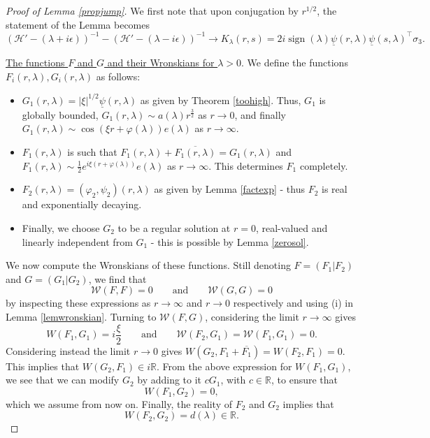 \documentclass[11 pt]{amsart}
\theoremstyle{definition}
\theoremstyle{remark}
\numberwithin{equation}{section}
\begin{document}
\begin{proof}[Proof of Lemma \ref{propjump}] We first note that upon conjugation by $r^{1/2}$, the statement of the Lemma becomes
$$
(\mathcal{H}'- (\lambda + i\epsilon))^{-1} - (\mathcal{H}'- (\lambda - i\epsilon))^{-1}
\longrightarrow K_\lambda(r,s) = 2 i \operatorname{sign}(\lambda) \underline \psi(r,\lambda) \underline \psi(s,\lambda)^\top \sigma_3.
$$


\medskip

\underline{The functions $F$ and $G$ and their Wronskians for $\lambda>0$}. We define the functions $F_i(r,\lambda), G_i(r,\lambda)$ as follows:
\begin{itemize}
\item $G_1(r,\lambda) = |\xi|^{1/2} \underline \psi(r,\lambda)$ as given by Theorem \ref{toohigh}. Thus, $G_1$ is globally bounded, $G_1(r,\lambda) \sim a(\lambda) r^{\frac 32}$ as $r \to 0$, and finally $G_1(r,\lambda) \sim \cos(\xi r + \varphi(\lambda)) e(\lambda)$ as $r \to \infty$.
\item $F_1(r,\lambda)$ is such that $F_1(r,\lambda) + \overline{F_1(r,\lambda)} = G_1(r,\lambda)$ and $F_1(r,\lambda) \sim \frac 12 e^{i \xi (r + \varphi(\lambda))} e(\lambda)$ as $r \to \infty$. This determines $F_1$ completely.
\item $F_2(r,\lambda) = (\varphi_2,\psi_2)(r,\lambda)$ as given by Lemma \ref{factexp} - thus $F_2$ is real and exponentially decaying.
\item Finally, we choose $G_2$ to be a regular solution at $r=0$, real-valued and linearly independent from $G_1$ - this is possible by Lemma \ref{zerosol}.
\end{itemize}

We now compute the Wronskians of these functions. Still denoting $F = (F_1 | F_2)$ and $G= (G_1 | G_2)$, we find that
$$
\mathcal{W}(F,F) = 0 \qquad \mbox{and} \qquad \mathcal{W}(G,G) = 0
$$
by inspecting these expressions as $r \to \infty$ and $r \to 0$ respectively and using (i) in Lemma \ref{lemwronskian}. 
Turning to $\mathcal{W}(F,G)$, considering the limit $r\to \infty$ gives 
$$
W(F_1,G_1) = i \frac{\xi}{2} \qquad \mbox{and} \qquad \mathcal{W}(F_2,G_1) = \mathcal{W}(F_1,G_1) = 0.
$$ 
Considering instead the limit $r \to 0$ gives $W(G_2,F_1 + \overline{F_1}) = W(F_2,F_1) = 0$. This implies that $W(G_2,F_1) \in i \mathbb{R}$. From the above expression for $W(F_1,G_1)$, we see that we can modify $G_2$ by adding to it $cG_1$, with $c \in \mathbb{R}$, to ensure that
$$
W(F_1,G_2) = 0, 
$$
which we assume from now on. Finally, the reality of $F_2$ and $G_2$ implies that
$$
W(F_2,G_2) = d(\lambda) \in \mathbb{R}.
$$


\end{proof}
\end{document}
